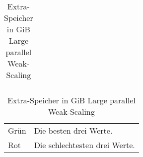 \begin{table}[ht]
{\begin{tabular}{lrrrrrrrrrrrrrrrrrrrrr}
\bottomrule
\end{tabular}
}
\caption{Extra-Speicher in GiB Large parallel Weak-Scaling}
\label{messung:tab:memory-large-par-weak}
\begin{tabular}{ll}
{\color{green}Grün} & Die besten drei Werte.\\
{\color{red}Rot} & Die schlechtesten drei Werte.\\
\end{tabular}
\end{table}

